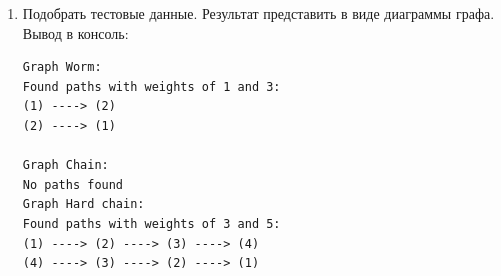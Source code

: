 \documentclass[a4paper,14pt]{extarticle}
\begin{document}
\begin{enumerate}[1.]
\begin{verbatim}
    if (begin != end)
        printPath(graph, shortestWayMatrix, begin, shortestWayMatrix[begin][end].second, false);

    std::cout << "(" << graph.nodes[end]->name << ")";
    if (!isEnd)
        std::cout << " ----> ";
}

template<typename T>
void analyzeTree(T& g, std::string graphName) {
    std::cout << "Graph " << graphName << ":\n";
    auto shortestWayMatrix = g.getShortestWayMatrix();
    bool anyFound = false;
    
    for (int i = 0; i < g.nodes.size(); i++) {
        for (int j = i + 1; j < g.nodes.size(); j++) {
            if (j == i) continue;

            // Пути должны существовать
            if (shortestWayMatrix[i][j].second == -1 || shortestWayMatrix[j][i].second == -1) continue;

            // Длина путей должна быть равна
            if (shortestWayMatrix[i][j].first == shortestWayMatrix[j][i].first) continue;

            bool shouldSwap = false;
            if (shortestWayMatrix[i][j].first > shortestWayMatrix[j][i].first)  {
                shouldSwap = true;
                std::swap(i, j);
            }
        
            anyFound = true;
            std::cout << "Found paths with weights of " << shortestWayMatrix[i][j].first << " and " << shortestWayMatrix[j][i].first << ":\n";
            printPath(g, shortestWayMatrix, i, j, true);
            std::cout << "\n";
            printPath(g, shortestWayMatrix, j, i, true);
            std::cout << "\n" << std::endl;

            if (shouldSwap)
                std::swap(i, j);      
        }
    }

    if (!anyFound) 
        std::cout << "No paths found" << std::endl;
}
                \end{verbatim}
        \item Подобрать тестовые данные. Результат представить в виде диаграммы графа.\\
        Вывод в консоль:
                    \begin{verbatim}
Graph Worm:
Found paths with weights of 1 and 3:
(1) ----> (2)
(2) ----> (1)

Graph Chain:
No paths found
Graph Hard chain:
Found paths with weights of 3 and 5:
(1) ----> (2) ----> (3) ----> (4)  
(4) ----> (3) ----> (2) ----> (1)  


\end{verbatim}
\end{enumerate}
\end{document}
